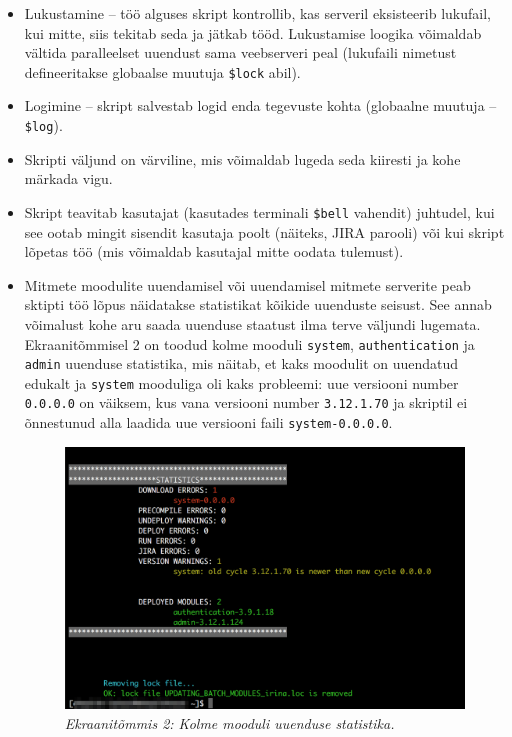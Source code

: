 \documentclass[12pt]{report}
\newcommand{\code}[1]{\texttt{#1}}
\begin{document}
  \begin{itemize}
    \item Lukustamine \--- töö alguses skript kontrollib, kas serveril eksisteerib lukufail, kui mitte, siis tekitab seda ja jätkab tööd. Lukustamise loogika võimaldab vältida paralleelset uuendust sama veebserveri peal (lukufaili nimetust defineeritakse globaalse muutuja \code{\$lock} abil).
    
    \item Logimine \--- skript salvestab logid enda tegevuste kohta (globaalne muutuja \--- \code{\$log}).
    
    \item Skripti väljund on värviline, mis võimaldab lugeda seda kiiresti ja kohe märkada vigu.
    
    \item Skript teavitab kasutajat (kasutades terminali \code{\$bell} vahendit) juhtudel, kui see ootab mingit sisendit kasutaja poolt (näiteks, JIRA parooli) või kui skript lõpetas töö (mis võimaldab kasutajal mitte oodata tulemust).
    
    \item Mitmete moodulite uuendamisel või uuendamisel mitmete serverite peab sktipti töö lõpus näidatakse statistikat kõikide uuenduste seisust. See annab võimalust kohe aru saada uuenduse staatust ilma terve väljundi lugemata. Ekraanitõmmisel 2 on toodud kolme mooduli \code{system}, \code{authentication} ja \code{admin} uuenduse statistika, mis näitab, et kaks moodulit on uuendatud edukalt ja \code{system} mooduliga oli kaks probleemi: uue versiooni number \code{0.0.0.0} on väiksem, kus vana versiooni number \code{3.12.1.70} ja skriptil ei õnnestunud alla laadida uue versiooni faili \code{system-0.0.0.0}.
    \begin{figure}[H]
     \begin{center}
       \includegraphics[width=.75\textwidth]{screenshots/statistics.png}
       \caption*{\textit{Ekraanitõmmis 2: Kolme mooduli uuenduse statistika.}}
     \end{center}
   \end{figure}
   

\end{itemize}
\end{document}
